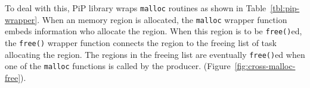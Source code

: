 To deal with this, PiP library wraps {\tt malloc} routines as shown in
Table~\ref{tbl:pip-wrapper}. When an memory region is allocated, the
{\tt malloc} wrapper function embeds information who allocate the
region. When this region is to be {\tt free()}ed, the {\tt free()}
wrapper function connects the region to the freeing list of task
allocating the region. The regions in the freeing list are eventually
{\tt free()}ed when one of the {\tt malloc} functions is called by the
producer. (Figure~\ref{fig:cross-malloc-free}). 
